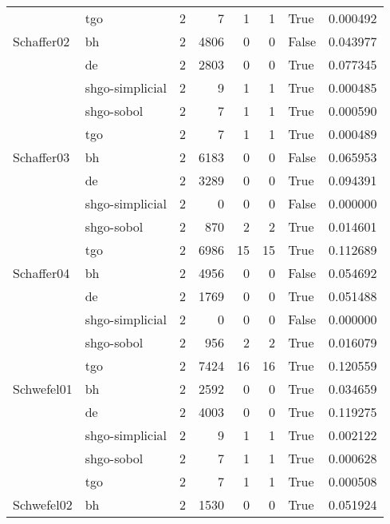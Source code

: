\begin{longtable}{llrrrrlr}
         & tgo &     2 &        7 &      1 &       1 &    True &    0.000492 \\
Schaffer02 & bh &     2 &     4806 &      0 &       0 &   False &    0.043977 \\
         & de &     2 &     2803 &      0 &       0 &    True &    0.077345 \\
         & shgo-simplicial &     2 &        9 &      1 &       1 &    True &    0.000485 \\
         & shgo-sobol &     2 &        7 &      1 &       1 &    True &    0.000590 \\
         & tgo &     2 &        7 &      1 &       1 &    True &    0.000489 \\
Schaffer03 & bh &     2 &     6183 &      0 &       0 &   False &    0.065953 \\
         & de &     2 &     3289 &      0 &       0 &    True &    0.094391 \\
         & shgo-simplicial &     2 &        0 &      0 &       0 &   False &    0.000000 \\
         & shgo-sobol &     2 &      870 &      2 &       2 &    True &    0.014601 \\
         & tgo &     2 &     6986 &     15 &      15 &    True &    0.112689 \\
Schaffer04 & bh &     2 &     4956 &      0 &       0 &   False &    0.054692 \\
         & de &     2 &     1769 &      0 &       0 &    True &    0.051488 \\
         & shgo-simplicial &     2 &        0 &      0 &       0 &   False &    0.000000 \\
         & shgo-sobol &     2 &      956 &      2 &       2 &    True &    0.016079 \\
         & tgo &     2 &     7424 &     16 &      16 &    True &    0.120559 \\
Schwefel01 & bh &     2 &     2592 &      0 &       0 &    True &    0.034659 \\
         & de &     2 &     4003 &      0 &       0 &    True &    0.119275 \\
         & shgo-simplicial &     2 &        9 &      1 &       1 &    True &    0.002122 \\
         & shgo-sobol &     2 &        7 &      1 &       1 &    True &    0.000628 \\
         & tgo &     2 &        7 &      1 &       1 &    True &    0.000508 \\
Schwefel02 & bh &     2 &     1530 &      0 &       0 &    True &    0.051924 \\

\end{longtable}
